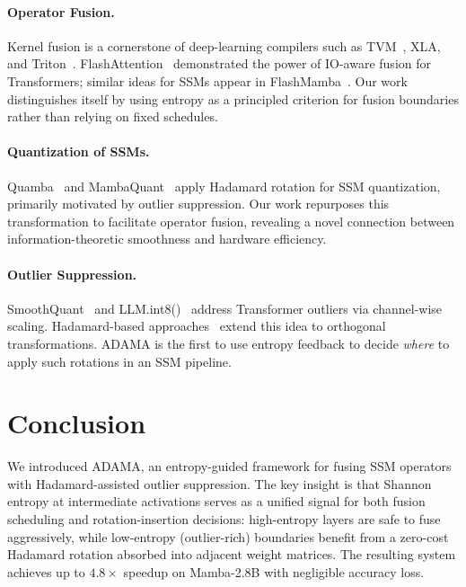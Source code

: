 \documentclass{article}
\begin{document}
\paragraph{Operator Fusion.}
Kernel fusion is a cornerstone of deep-learning compilers such as
TVM~\citep{chen2018tvm}, XLA, and Triton~\citep{tillet2019triton}.
FlashAttention~\citep{dao2022flashattention} demonstrated the power of
IO-aware fusion for Transformers; similar ideas for SSMs appear in
FlashMamba~\citep{dao2024mamba2}.  Our work distinguishes itself by using
entropy as a principled criterion for fusion boundaries rather than relying on
fixed schedules.

\paragraph{Quantization of SSMs.}
Quamba~\citep{liu2024quamba} and MambaQuant~\citep{zhu2024mambaquant}
apply Hadamard rotation for SSM quantization, primarily motivated by outlier
suppression.  Our work repurposes this transformation to facilitate operator
fusion, revealing a novel connection between information-theoretic smoothness
and hardware efficiency.

\paragraph{Outlier Suppression.}
SmoothQuant~\citep{xiao2023smoothquant} and LLM.int8()~\citep{dettmers2022gpt3int8}
address Transformer outliers via channel-wise scaling.  Hadamard-based
approaches~\citep{ashkboos2024quarot,lin2024qserve} extend this idea to
orthogonal transformations.  ADAMA is the first to use entropy feedback to
decide \emph{where} to apply such rotations in an SSM pipeline.

\section{Conclusion}
\label{sec:conclusion}

We introduced ADAMA, an entropy-guided framework for fusing SSM operators with
Hadamard-assisted outlier suppression.  The key insight is that Shannon entropy
at intermediate activations serves as a unified signal for both fusion
scheduling and rotation-insertion decisions: high-entropy layers are safe to
fuse aggressively, while low-entropy (outlier-rich) boundaries benefit from a
zero-cost Hadamard rotation absorbed into adjacent weight matrices.
The resulting system achieves up to $4.8\times$ speedup on Mamba-2.8B with
negligible accuracy loss.
\end{document}
